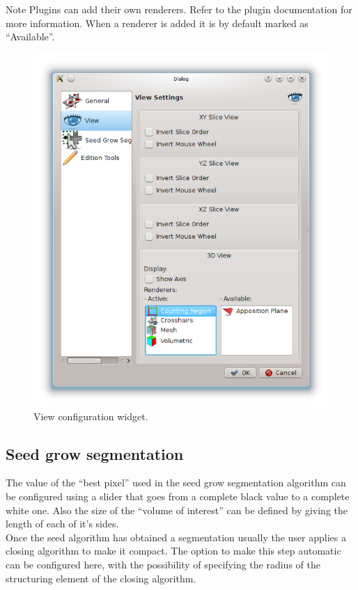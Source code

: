 \begin{bclogo}[couleur = yellow!33, logo=\bcattention]
{Note} Plugins can add their own renderers. Refer to the plugin documentation for more information.
When a renderer is added it is by default marked as ``Available''.
\end{bclogo}

\begin{figure}[H]
\centering
\includegraphics[scale=0.75]{fig/Configuration-view}
\caption{View configuration widget.}
\end{figure}

\subsection{Seed grow segmentation}

The value of the ``best pixel'' used in the seed grow segmentation algorithm can be configured using
a slider that goes from a complete black value to a complete white one. Also the size of the ``volume
of interest'' can be defined by giving the length of each of it's sides.\\
Once the seed algorithm has obtained a segmentation usually the user applies a closing algorithm to
make it compact. The option to make this step automatic can be configured here, with the possibility of
specifying the radius of the structuring element of the closing algorithm.\\

